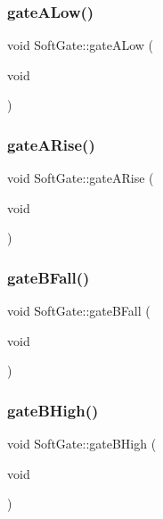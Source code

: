 \subsubsection{\texorpdfstring{gate\+A\+Low()}{gateALow()}}
{\footnotesize\ttfamily void Soft\+Gate\+::gate\+A\+Low (\begin{DoxyParamCaption}\item[{void}]{ }\end{DoxyParamCaption})\hspace{0.3cm}{\ttfamily [private]}}

\mbox{\label{class_soft_gate_aad2cd02c0999d1f23a38f416f517c317}} 
\subsubsection{\texorpdfstring{gate\+A\+Rise()}{gateARise()}}
{\footnotesize\ttfamily void Soft\+Gate\+::gate\+A\+Rise (\begin{DoxyParamCaption}\item[{void}]{ }\end{DoxyParamCaption})\hspace{0.3cm}{\ttfamily [private]}}

\mbox{\label{class_soft_gate_a43ccf23bf10c01e1a5f18b0cca398fe5}} 
\subsubsection{\texorpdfstring{gate\+B\+Fall()}{gateBFall()}}
{\footnotesize\ttfamily void Soft\+Gate\+::gate\+B\+Fall (\begin{DoxyParamCaption}\item[{void}]{ }\end{DoxyParamCaption})\hspace{0.3cm}{\ttfamily [private]}}

\mbox{\label{class_soft_gate_af94152dbc0f49a649c0f8a866ddf5b08}} 
\subsubsection{\texorpdfstring{gate\+B\+High()}{gateBHigh()}}
{\footnotesize\ttfamily void Soft\+Gate\+::gate\+B\+High (\begin{DoxyParamCaption}\item[{void}]{ }\end{DoxyParamCaption})\hspace{0.3cm}{\ttfamily [private]}}

